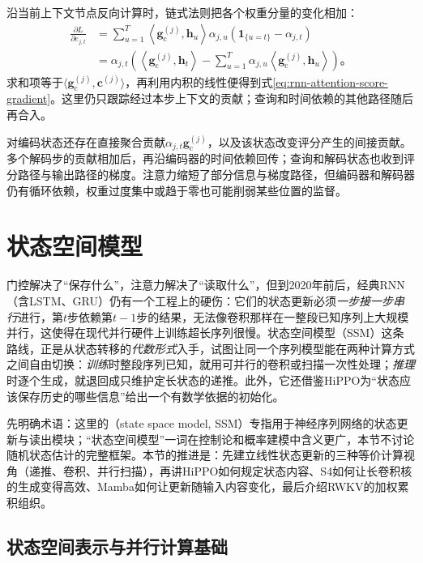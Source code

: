 沿当前上下文节点反向计算时，链式法则把各个权重分量的变化相加：
\[
  \begin{aligned}
    \frac{\partial L}{\partial e_{j,t}}
      &=\sum_{u=1}^{T}
        \left\langle\bm g_{\mathrm c}^{(j)},\bm h_u\right\rangle
        \alpha_{j,u}(\mathbf{1}_{\{u=t\}}-\alpha_{j,t})\\
      &=\alpha_{j,t}\left(
        \left\langle\bm g_{\mathrm c}^{(j)},\bm h_t\right\rangle
        -\sum_{u=1}^{T}\alpha_{j,u}
         \left\langle\bm g_{\mathrm c}^{(j)},\bm h_u\right\rangle
        \right)\text{。}
  \end{aligned}
\]
求和项等于$\langle\bm g_{\mathrm c}^{(j)},\bm c^{(j)}\rangle$，再利用内积的线性便得到式\eqref{eq:rnn-attention-score-gradient}。这里仍只跟踪经过本步上下文的贡献；查询和时间依赖的其他路径随后再合入。

对编码状态还存在直接聚合贡献$\alpha_{j,t}\bm{g}_{\mathrm{c}}^{(j)}$，以及该状态改变评分产生的间接贡献。多个解码步的贡献相加后，再沿编码器的时间依赖回传；查询和解码状态也收到评分路径与输出路径的梯度。注意力缩短了部分信息与梯度路径，但编码器和解码器仍有循环依赖，权重过度集中或趋于零也可能削弱某些位置的监督。

\FloatBarrier
\section{状态空间模型}
\label{sec:rnn-state-space}

门控解决了“保存什么”，注意力解决了“读取什么”，但到2020年前后，经典RNN（含LSTM、GRU）仍有一个工程上的硬伤：它们的状态更新必须\emph{一步接一步串行}进行，第$t$步依赖第$t-1$步的结果，无法像卷积那样在一整段已知序列上大规模并行，这使得在现代并行硬件上训练超长序列很慢。状态空间模型（SSM）这条路线，正是从状态转移的\emph{代数形式}入手，试图让同一个序列模型能在两种计算方式之间自由切换：\emph{训练}时整段序列已知，就用可并行的卷积或扫描一次性处理；\emph{推理}时逐个生成，就退回成只维护定长状态的递推。此外，它还借鉴HiPPO为“状态应该保存历史的哪些信息”给出一个有数学依据的初始化。

先明确术语：这里的（state space model, SSM）专指用于神经序列网络的状态更新与读出模块；“状态空间模型”一词在控制论和概率建模中含义更广，本节不讨论随机状态估计的完整框架。本节的推进是：先建立线性状态更新的三种等价计算视角（递推、卷积、并行扫描），再讲HiPPO如何规定状态内容、S4如何让长卷积核的生成变得高效、Mamba如何让更新随输入内容变化，最后介绍RWKV的加权累积组织。

\subsection{状态空间表示与并行计算基础}
\label{sec:rnn-ssm-foundations}

